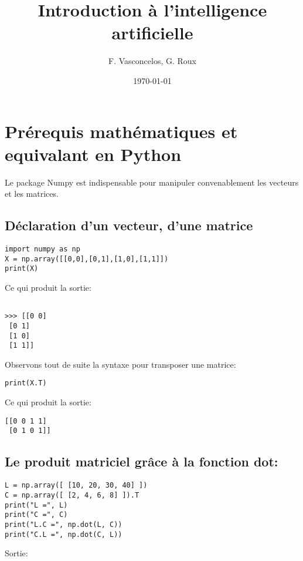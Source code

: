 \documentclass[11pt]{article}
\author{F. Vasconcelos, G. Roux}
\date{\today}
\title{Introduction à l'intelligence artificielle}
\begin{document}
\maketitle
\tableofcontents



\section{Prérequis mathématiques et equivalant en Python}
\label{sec-1}

Le package Numpy est indispensable pour manipuler convenablement les vecteurs
et les matrices.

\subsection{Déclaration d'un vecteur, d'une matrice}
\label{sec-1-1}

\begin{verbatim}
import numpy as np
X = np.array([[0,0],[0,1],[1,0],[1,1]])
print(X)
\end{verbatim}

Ce qui produit la sortie:

\begin{verbatim}

>>> [[0 0]
 [0 1]
 [1 0]
 [1 1]]
\end{verbatim}

Observons tout de suite la syntaxe pour transposer une matrice:

\begin{verbatim}
print(X.T)
\end{verbatim}

Ce qui produit la sortie:

\begin{verbatim}
[[0 0 1 1]
 [0 1 0 1]]
\end{verbatim}

\subsection{Le produit matriciel grâce à la fonction dot:}
\label{sec-1-2}

\begin{verbatim}
L = np.array([ [10, 20, 30, 40] ])
C = np.array([ [2, 4, 6, 8] ]).T
print("L =", L)
print("C =", C)
print("L.C =", np.dot(L, C))
print("C.L =", np.dot(C, L))
\end{verbatim}

Sortie:
\end{document}
